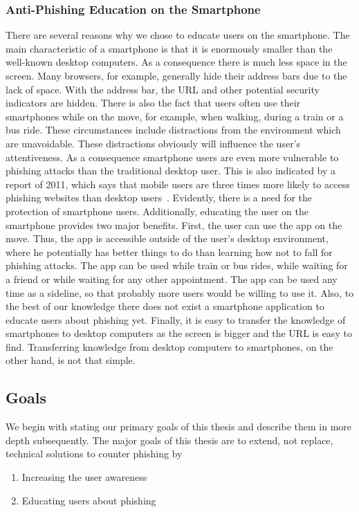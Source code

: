 \subsubsection{Anti-Phishing Education on the Smartphone}
\label{s:antiphishing_on_smartphone}
There are several reasons why we chose to educate users on the smartphone. The main characteristic of a smartphone is that it is enormously smaller than the well-known desktop computers. As a consequence there is much less space in the screen. Many browsers, for example, generally hide their address bars due to the lack of space. With the address bar, the URL and other potential security indicators are hidden. There is also the fact that users often use their smartphones while on the move, for example, when walking, during a train or a bus ride. These circumstances include distractions from the environment which are unavoidable. These distractions obviously will influence the user's attentiveness. As a consequence smartphone users are even more vulnerable to phishing attacks than the traditional desktop user. This is also indicated by a report of 2011, which says that mobile users are three times more likely to access phishing websites than desktop users~\cite{trusteer2011}. Evidently, there is a need for the protection of smartphone users. Additionally, educating the user on the smartphone provides two major benefits. First, the user can use the app on the move. Thus, the app is accessible outside of the user's desktop environment, where he potentially has better things to do than learning how not to fall for phishing attacks. The app can be used while train or bus rides, while waiting for a friend or while waiting for any other appointment. The app can be used any time as a sideline, so that probably more users would be willing to use it. Also, to the best of our knowledge there does not exist a smartphone application to educate users about phishing yet. Finally, it is easy to transfer the knowledge of smartphones to desktop computers as the screen is bigger and the URL is easy to find. Transferring knowledge from desktop computers to smartphones, on the other hand, is not that simple.

\subsection{Goals}
\label{s:goals}
We begin with stating our primary goals of this thesis and describe them in more depth subsequently. The major goals of this thesis are to extend, not replace, technical solutions to counter phishing by
\begin{enumerate}
	\item Increasing the user awareness
	\item Educating users about phishing 
\end{enumerate}

